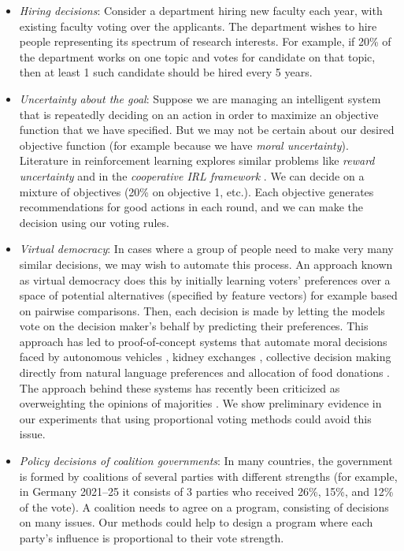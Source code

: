 \documentclass[10pt]{scrartcl}
\theoremstyle{plain}
\theoremstyle{definition}
\begin{document}
\begin{itemize}[leftmargin=15pt]
	\item \emph{Hiring decisions}: Consider a department hiring new faculty each year, with existing faculty voting over the applicants. The department wishes to hire people representing its spectrum of research interests. For example, if 20\% of the department works on one topic and votes for candidate on that topic, then at least 1 such candidate should be hired every 5 years.
	\item \emph{Uncertainty about the goal}: Suppose we are managing an intelligent system that is repeatedly deciding on an action in order to maximize an objective function that we have specified. But we may not be certain about our desired objective function (for example because we have \emph{moral uncertainty}). Literature in reinforcement learning explores similar problems like \emph{reward uncertainty} \citep{liang2022reward} and in the \emph{cooperative IRL framework} \citep{hadfield2016cooperative}.
    We can decide on a mixture of objectives (20\% on objective 1, etc.). Each objective generates recommendations for good actions in each round, and we can make the decision using our voting rules. 
	\item \emph{Virtual democracy}: In cases where a group of people need to make very many similar decisions, we may wish to automate this process. An approach known as virtual democracy does this by initially learning voters' preferences over a space of potential alternatives (specified by feature vectors) for example based on pairwise comparisons. Then, each decision is made by letting the models vote on the decision maker's behalf by predicting their preferences. This approach has led to proof-of-concept systems that automate moral decisions faced by autonomous vehicles \citep{noothigattu2018voting}, kidney exchanges \citep{freedman2020adapting}, collective decision making directly from natural language preferences \citep{mohsin2021making} and allocation of food donations \citep{lee2019webuildai}. The approach behind these systems has recently been criticized as overweighting the opinions of majorities \citep{moralmachinetyranny}. We show preliminary evidence in our experiments that using proportional voting methods could avoid this issue.
\item \emph{Policy decisions of coalition governments}: In many countries, the government is formed by coalitions of several parties with different strengths (for example, in Germany 2021--25 it consists of 3 parties who received 26\%, 15\%, and 12\% of the vote). A coalition needs to agree on a program, consisting of decisions on many issues. Our methods could help to design a program where each party's influence is proportional to their vote strength.

\end{itemize}
\end{document}
